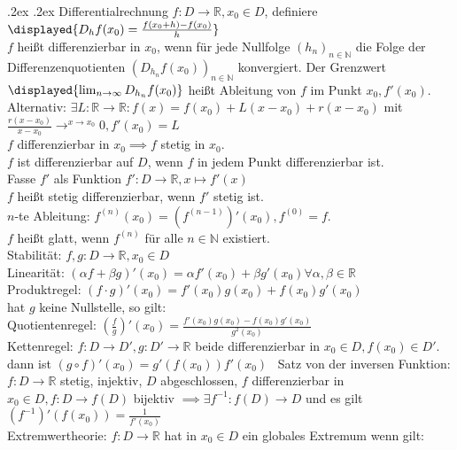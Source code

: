 \documentclass[9pt, landscape,a4paper]{extarticle}
\makeatletter
\renewcommand{\section}{\@startsection{section}{1}{0mm}%
                                {.2ex}%
                                {.2ex}%
                                {\sffamily\small\bfseries}}
\makeatother
\begin{document}
\begin{multicols*}{4}
  \section{Differentialrechnung}
  $f:D\to\mathbb{R}, x_0 \in D$, definiere \\
  $\displayed{D_h f(x_0) = \frac{f(x_0 + h) - f(x_0)}{h}}$ \\
  $f$ heißt differenzierbar in $x_0$, wenn für jede Nullfolge $(h_n)_{n\in\mathbb{N}}$ die Folge der Differenzenquotienten $(D_{h_n} f(x_0))_{n\in\mathbb{N}}$ konvergiert.
  Der Grenzwert $\displayed{\lim_{n\to\infty} D_{h_n} f(x_0)}$ heißt Ableitung von $f$ im Punkt $x_0, f'(x_0)$. \\
  Alternativ: $\exists L:\mathbb{R} \to \mathbb{R}: f(x) = f(x_0) + L(x - x_0) + r(x - x_0)$ mit $\frac{r(x - x_0)}{x - x_0} \to^{x\rightarrow x_0} 0, f'(x_0) = L$ \\
  $f$ differenzierbar in $x_0 \implies f$ stetig in $x_0$. \\
  $f$ ist differenzierbar auf $D$, wenn $f$ in jedem Punkt differenzierbar ist. \\
  Fasse $f'$ als Funktion $f': D\to\mathbb{R}, x\mapsto f'(x)$ \\
  $f$ heißt stetig differenzierbar, wenn $f'$ stetig ist. \\
  $n$-te Ableitung: $f^{(n)}(x_0) = (f^{(n - 1)})' (x_0), f^{(0)} = f$. \\
  $f$ heißt glatt, wenn $f^{(n)}$ für alle $n\in\mathbb{N}$ existiert. \\
  Stabilität: $f,g: D\to\mathbb{R}, x_0 \in D$ \\
  Linearität: $(\alpha f + \beta g)'(x_0) = \alpha f'(x_0) + \beta g'(x_0) \forall \alpha, \beta \in \mathbb{R}$ \\
  Produktregel: $(f\cdot g)'(x_0) = f'(x_0)g(x_0) + f(x_0)g'(x_0)$ \\
  hat $g$ keine Nullstelle, so gilt: \\
  Quotientenregel: $(\frac{f}{g})'(x_0) = \frac{f'(x_0)g(x_0) - f(x_0)g'(x_0)}{g^2(x_0)}$ \\
  Kettenregel: $f: D\to D', g: D'\to \mathbb{R}$ beide differenzierbar in $x_0\in D, f(x_0) \in D'$.
  dann ist $(g\circ f)'(x_0) = g'(f(x_0))f'(x_0)$ \
  Satz von der inversen Funktion: $f: D\to\mathbb{R}$ stetig, injektiv, $D$ abgeschlossen, $f$ differenzierbar in $x_0 \in D, f: D\to f(D)$ bijektiv $\implies \exists f^{-1}:f(D) \to D$ und es gilt
  $(f^{-1})'(f(x_0)) = \frac{1}{f'(x_0)}$ \\
  Extremwertheorie: $f:D\to\mathbb{R}$ hat in $x_0 \in D$ ein globales Extremum wenn gilt: \\

\end{multicols*}
\end{document}
